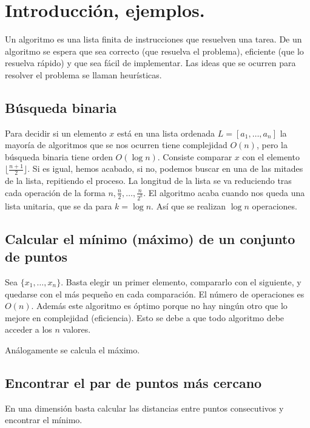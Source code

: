 \documentclass[AL.tex]{subfiles}
\begin{document}

\chapter{Introducción, ejemplos.}

Un algoritmo es una lista finita de instrucciones que resuelven una tarea. De un algoritmo se espera que sea correcto (que resuelva el problema), eficiente (que lo resuelva rápido) y que sea fácil de implementar. Las ideas que se ocurren para resolver el problema se llaman heurísticas. 
\section{Búsqueda binaria}

Para decidir si un elemento $x$ está en una lista ordenada $L=[a_1,\dots, a_n]$ la mayoría de algoritmos que se nos ocurren tiene complejidad $O(n)$, pero la búsqueda binaria tiene orden $O(\log n)$. Consiste comparar $x$ con el elemento $\lfloor \frac{n+1}{2}\rfloor$. Si es igual, hemos acabado, si no, podemos buscar en una de las mitades de la lista, repitiendo el proceso. La longitud de la lista se va reduciendo tras cada operación de la forma $n, \frac{n}{2}, \dots, \frac{n}{2^k}$. El algoritmo acaba cuando nos queda una lista unitaria, que se da para $k=\log n$. Así que se realizan $\log n$ operaciones. 

\section{Calcular el mínimo (máximo) de un conjunto de puntos}
Sea $\{x_1,\dots, x_n\}$. Basta elegir un primer elemento, compararlo con el siguiente, y quedarse con el más pequeño en cada comparación. El número de operaciones es $O(n)$. Además este algoritmo es óptimo porque no hay ningún otro que lo mejore en complejidad (eficiencia). Esto se debe a que todo algoritmo debe acceder a los $n$ valores. 

Análogamente se calcula el máximo. 



\section{Encontrar el par de puntos más cercano}

En una dimensión basta calcular las distancias entre puntos consecutivos y encontrar el mínimo.
\end{document}
